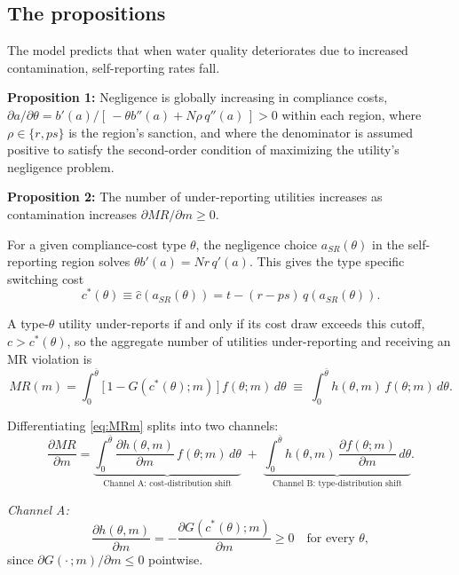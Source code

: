 \documentclass{article}
\begin{document}
	\subsection{The propositions}
	
	The model predicts that when water quality deteriorates due to increased contamination, self-reporting rates fall.
	
	\textbf{Proposition 1:} Negligence is globally increasing in compliance costs, $\partial a/\partial\theta = b'(a) / [\,-\theta b''(a) + N\rho\, q''(a)\,] > 0$ within each region, where $\rho \in \{r, ps\}$ is the region's sanction, and where the denominator is assumed positive to satisfy the second-order condition of maximizing the utility's negligence problem.
	
	\textbf{Proposition 2:} The number of under-reporting utilities increases as contamination increases $\partial MR/\partial m \ge 0$.

    For a given compliance-cost type $\theta$, the negligence choice $a_{SR}(\theta)$ in the self-reporting region solves $\theta b'(a) = Nr\,q'(a)$. This gives the type specific switching cost
	\begin{equation}\label{eq:cstar}
		c^*(\theta) \equiv \hat{c}(a_{SR}(\theta)) = t - (r-ps)\,q(a_{SR}(\theta)).
	\end{equation}
	
	A type-$\theta$ utility under-reports if and only if its cost draw exceeds this cutoff, $c > c^*(\theta)$, so the aggregate number of utilities under-reporting and receiving an MR violation is
	\begin{equation}\label{eq:MRm}
		MR(m) = \int_0^{\bar\theta} \big[\,1 - G(c^*(\theta);m)\,\big]\, f(\theta;m)\, d\theta \;\equiv\; \int_0^{\bar\theta} h(\theta,m)\, f(\theta;m)\, d\theta.
	\end{equation}
	
	Differentiating \eqref{eq:MRm} splits into two channels:
	\begin{equation}\label{eq:split}
		\frac{\partial MR}{\partial m} = \underbrace{\int_0^{\bar\theta} \frac{\partial h(\theta,m)}{\partial m}\, f(\theta;m)\, d\theta}_{\text{Channel A: cost-distribution shift}} \;+\; \underbrace{\int_0^{\bar\theta} h(\theta,m)\, \frac{\partial f(\theta;m)}{\partial m}\, d\theta}_{\text{Channel B: type-distribution shift}}.
	\end{equation}
	
	\textit{Channel A:}
	\[
	\frac{\partial h(\theta,m)}{\partial m} = -\frac{\partial G(c^*(\theta);m)}{\partial m} \ge 0 \quad \text{for every } \theta,
	\]
	since $\partial G(\cdot\,;m)/\partial m \le 0$ pointwise. 
    
\end{document}
